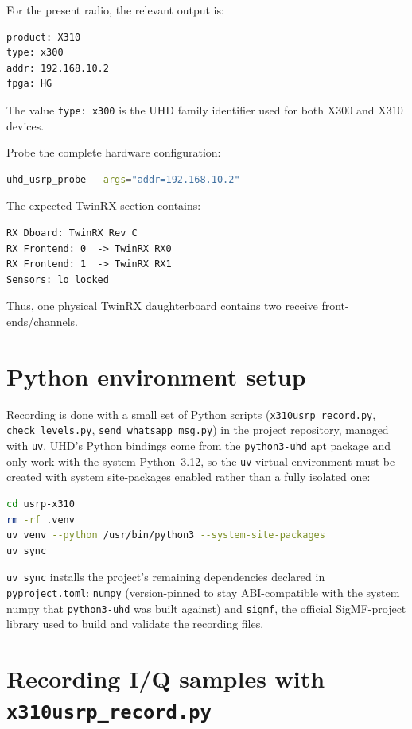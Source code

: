 \documentclass[11pt,a4paper]{article}
\begin{document}
For the present radio, the relevant output is:

\begin{lstlisting}
product: X310
type: x300
addr: 192.168.10.2
fpga: HG
\end{lstlisting}

The value \texttt{type: x300} is the UHD family identifier used for both X300 and X310 devices.

Probe the complete hardware configuration:

\begin{lstlisting}[language=bash]
uhd_usrp_probe --args="addr=192.168.10.2"
\end{lstlisting}

The expected TwinRX section contains:

\begin{lstlisting}
RX Dboard: TwinRX Rev C
RX Frontend: 0  -> TwinRX RX0
RX Frontend: 1  -> TwinRX RX1
Sensors: lo_locked
\end{lstlisting}

Thus, one physical TwinRX daughterboard contains two receive front-ends/channels.

\section{Python environment setup}

Recording is done with a small set of Python scripts (\texttt{x310usrp\_record.py}, \texttt{check\_levels.py}, \texttt{send\_whatsapp\_msg.py}) in the project repository, managed with \texttt{uv}. UHD's Python bindings come from the \texttt{python3-uhd} apt package and only work with the system Python~3.12, so the \texttt{uv} virtual environment must be created with system site-packages enabled rather than a fully isolated one:

\begin{lstlisting}[language=bash]
cd usrp-x310
rm -rf .venv
uv venv --python /usr/bin/python3 --system-site-packages
uv sync
\end{lstlisting}

\texttt{uv sync} installs the project's remaining dependencies declared in \texttt{pyproject.toml}: \texttt{numpy} (version-pinned to stay ABI-compatible with the system numpy that \texttt{python3-uhd} was built against) and \texttt{sigmf}, the official SigMF-project library used to build and validate the recording files.

\section{Recording I/Q samples with \texttt{x310usrp\_record.py}}
\end{document}
